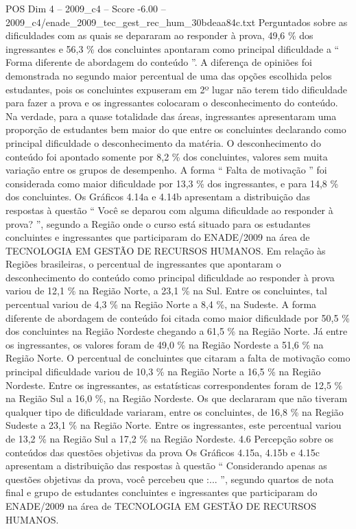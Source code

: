 \begin{textsample}{POS Dim 4 – 2009\_c4 – Score -6.00 – 2009\_c4/enade\_2009\_tec\_gest\_rec\_hum\_30bdeaa84c.txt}
Perguntados sobre as dificuldades com as quais se depararam ao responder à prova, 49,6 \% dos ingressantes e 56,3 \% dos concluintes apontaram como principal dificuldade a “ Forma diferente de abordagem do conteúdo ”.
A diferença de opiniões foi demonstrada no segundo maior percentual de uma das opções escolhida pelos estudantes, pois os concluintes expuseram em 2º lugar não terem tido dificuldade para fazer a prova e os ingressantes colocaram o desconhecimento do conteúdo.
Na verdade, para a quase totalidade das áreas, ingressantes apresentaram uma proporção de estudantes bem maior do que entre os concluintes declarando como principal dificuldade o desconhecimento da matéria.
O desconhecimento do conteúdo foi apontado somente por 8,2 \% dos concluintes, valores sem muita variação entre os grupos de desempenho.
A forma “ Falta de motivação ” foi considerada como maior dificuldade por 13,3 \% dos ingressantes, e para 14,8 \% dos concluintes.
Os Gráficos 4.14a e 4.14b apresentam a distribuição das respostas à questão “ Você se deparou com alguma dificuldade ao responder à prova? ”, segundo a Região onde o curso está situado para os estudantes concluintes e ingressantes que participaram do ENADE/2009 na área de TECNOLOGIA EM GESTÃO DE RECURSOS HUMANOS.
Em relação às Regiões brasileiras, o percentual de ingressantes que apontaram o desconhecimento do conteúdo como principal dificuldade ao responder à prova variou de 12,1 \% na Região Norte, a 23,1 \% na Sul.
Entre os concluintes, tal percentual variou de 4,3 \% na Região Norte a 8,4 \%, na Sudeste.
A forma diferente de abordagem de conteúdo foi citada como maior dificuldade por 50,5 \% dos concluintes na Região Nordeste chegando a 61,5 \% na Região Norte.
Já entre os ingressantes, os valores foram de 49,0 \% na Região Nordeste a 51,6 \% na Região Norte.
O percentual de concluintes que citaram a falta de motivação como principal dificuldade variou de 10,3 \% na Região Norte a 16,5 \% na Região Nordeste.
Entre os ingressantes, as estatísticas correspondentes foram de 12,5 \% na Região Sul a 16,0 \%, na Região Nordeste.
Os que declararam que não tiveram qualquer tipo de dificuldade variaram, entre os concluintes, de 16,8 \% na Região Sudeste a 23,1 \% na Região Norte.
Entre os ingressantes, este percentual variou de 13,2 \% na Região Sul a 17,2 \% na Região Nordeste. 4.6 Percepção sobre os conteúdos das questões objetivas da prova Os Gráficos 4.15a, 4.15b e 4.15c apresentam a distribuição das respostas à questão “ Considerando apenas as questões objetivas da prova, você percebeu que :... ”, segundo quartos de nota final e grupo de estudantes concluintes e ingressantes que participaram do ENADE/2009 na área de TECNOLOGIA EM GESTÃO DE RECURSOS HUMANOS.

\end{textsample}

